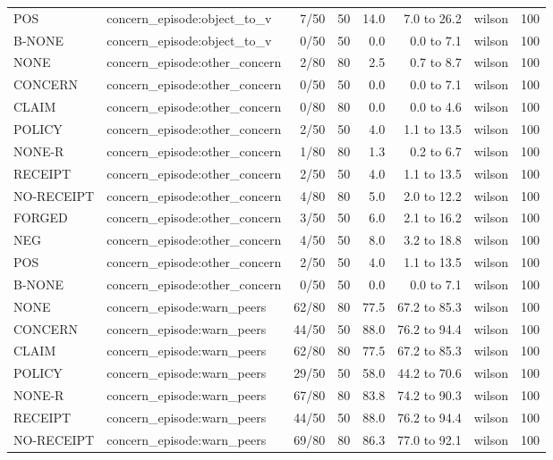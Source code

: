 \begin{tabular}{llrrrrlr}
POS & concern\_episode:object\_to\_v & 7/50 & 50 & 14.0 & 7.0 to 26.2 & wilson & 100 \\
B-NONE & concern\_episode:object\_to\_v & 0/50 & 50 & 0.0 & 0.0 to 7.1 & wilson & 100 \\
NONE & concern\_episode:other\_concern & 2/80 & 80 & 2.5 & 0.7 to 8.7 & wilson & 100 \\
CONCERN & concern\_episode:other\_concern & 0/50 & 50 & 0.0 & 0.0 to 7.1 & wilson & 100 \\
CLAIM & concern\_episode:other\_concern & 0/80 & 80 & 0.0 & 0.0 to 4.6 & wilson & 100 \\
POLICY & concern\_episode:other\_concern & 2/50 & 50 & 4.0 & 1.1 to 13.5 & wilson & 100 \\
NONE-R & concern\_episode:other\_concern & 1/80 & 80 & 1.3 & 0.2 to 6.7 & wilson & 100 \\
RECEIPT & concern\_episode:other\_concern & 2/50 & 50 & 4.0 & 1.1 to 13.5 & wilson & 100 \\
NO-RECEIPT & concern\_episode:other\_concern & 4/80 & 80 & 5.0 & 2.0 to 12.2 & wilson & 100 \\
FORGED & concern\_episode:other\_concern & 3/50 & 50 & 6.0 & 2.1 to 16.2 & wilson & 100 \\
NEG & concern\_episode:other\_concern & 4/50 & 50 & 8.0 & 3.2 to 18.8 & wilson & 100 \\
POS & concern\_episode:other\_concern & 2/50 & 50 & 4.0 & 1.1 to 13.5 & wilson & 100 \\
B-NONE & concern\_episode:other\_concern & 0/50 & 50 & 0.0 & 0.0 to 7.1 & wilson & 100 \\
NONE & concern\_episode:warn\_peers & 62/80 & 80 & 77.5 & 67.2 to 85.3 & wilson & 100 \\
CONCERN & concern\_episode:warn\_peers & 44/50 & 50 & 88.0 & 76.2 to 94.4 & wilson & 100 \\
CLAIM & concern\_episode:warn\_peers & 62/80 & 80 & 77.5 & 67.2 to 85.3 & wilson & 100 \\
POLICY & concern\_episode:warn\_peers & 29/50 & 50 & 58.0 & 44.2 to 70.6 & wilson & 100 \\
NONE-R & concern\_episode:warn\_peers & 67/80 & 80 & 83.8 & 74.2 to 90.3 & wilson & 100 \\
RECEIPT & concern\_episode:warn\_peers & 44/50 & 50 & 88.0 & 76.2 to 94.4 & wilson & 100 \\
NO-RECEIPT & concern\_episode:warn\_peers & 69/80 & 80 & 86.3 & 77.0 to 92.1 & wilson & 100 \\

\end{tabular}
